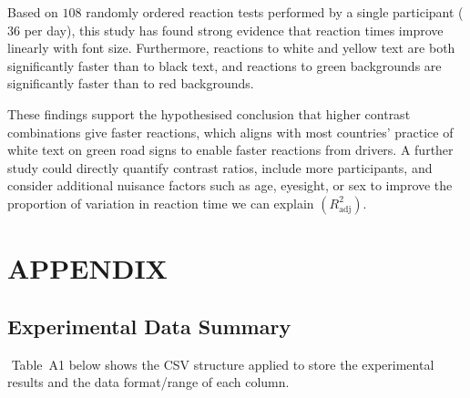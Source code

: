 \documentclass[12pt]{article}
\begin{document}
\noindent Based on $108$ randomly ordered reaction tests performed by a single participant ($36$ per day), this study has found strong evidence that reaction times improve linearly with font size. Furthermore, reactions to white and yellow text are both significantly faster than to black text, and reactions to green backgrounds are significantly faster than to red backgrounds. \newline
\enlargethispage{0.15cm}

These findings support the hypothesised conclusion that higher contrast combinations give faster reactions, which aligns with most countries' practice of white text on green road signs to enable faster reactions from drivers. A further study could directly quantify contrast ratios, include more participants, and consider additional nuisance factors such as age, eyesight, or sex to improve the proportion of variation in reaction time we can explain $\left(R^2_{\text{adj}}\right)$. 

\clearpage
\appendix

\renewcommand{\thesubsection}{A\arabic{subsection}}
\renewcommand{\thesubsubsection}{A\arabic{subsection}\alph{subsubsection}}

\setcounter{subsection}{0}
\setcounter{subsubsection}{0}

\renewcommand{\thetable}{A\arabic{table}}
\setcounter{table}{0}

\section*{APPENDIX}\label{sec:appendix}

\subsection{Experimental Data Summary}\label{app:design-summary}
$ $\newline
Table~A1 below shows the CSV structure applied to store the experimental results and the data format/range of each column.
\begin{table}[H]
\centering
\label{tab:design-summary}%
\caption{\texttt{REACTION\_TIMES\_BEN.csv} data structure.}
\end{table}
\end{document}
